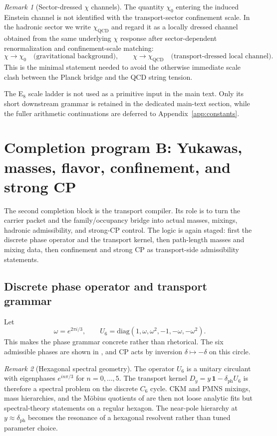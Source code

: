 \documentclass[11pt,a4paper]{article}
\theoremstyle{definition}
\theoremstyle{remark}
\newtheorem*{remark}{Remark}
\newcommand{\QCD}{\mathrm{QCD}}
\begin{document}
\begin{remark}[Sector-dressed \texorpdfstring{$\chi$}{chi} channels]
The quantity $\chi_0$ entering the induced Einstein channel is not identified with the transport-sector confinement scale. In the hadronic sector we write $\chi_{\QCD}$ and regard it as a locally dressed channel obtained from the same underlying $\chi$ response after sector-dependent renormalization and confinement-scale matching:
\[
\chi \longrightarrow \chi_0 \quad \text{(gravitational background)},
\qquad
\chi \longrightarrow \chi_{\QCD} \quad \text{(transport-dressed local channel)}.
\]
This is the minimal statement needed to avoid the otherwise immediate scale clash between the Planck bridge and the QCD string tension.
\end{remark}

The E$_8$ scale ladder is not used as a primitive input in the main text. Only its short downstream grammar is retained in the dedicated main-text section, while the fuller arithmetic continuations are deferred to Appendix~\ref{app:constants}.

\section{Completion program B: Yukawas, masses, flavor, confinement, and strong CP}

The second completion block is the transport compiler. Its role is to turn the carrier packet and the family/occupancy bridge into actual masses, mixings, hadronic admissibility, and strong-CP control. The logic is again staged: first the discrete phase operator and the transport kernel, then path-length masses and mixing data, then confinement and strong CP as transport-side admissibility statements.

\subsection{Discrete phase operator and transport grammar}

Let
\[
\omega=e^{2\pi i/3},
\qquad
U_6=\mathrm{diag}(1,\omega,\omega^2,-1,-\omega,-\omega^2).
\]
This makes the phase grammar concrete rather than rhetorical. The six admissible phases are shown in , and CP acts by inversion $\delta\mapsto-\delta$ on this circle.

\begin{remark}[Hexagonal spectral geometry]
The operator $U_6$ is a unitary circulant with eigenphases $e^{in\pi/3}$ for $n=0,\dots,5$. The transport kernel $D_y=y\,\mathbf 1-\delta_{\mathrm{ph}}U_6$ is therefore a spectral problem on the discrete $C_6$ cycle. CKM and PMNS mixings, mass hierarchies, and the Möbius quotients of  are then not loose analytic fits but spectral-theory statements on a regular hexagon. The near-pole hierarchy at $y\approx\delta_{\mathrm{ph}}$ becomes the resonance of a hexagonal resolvent rather than tuned parameter choice.
\end{remark}
\end{document}
